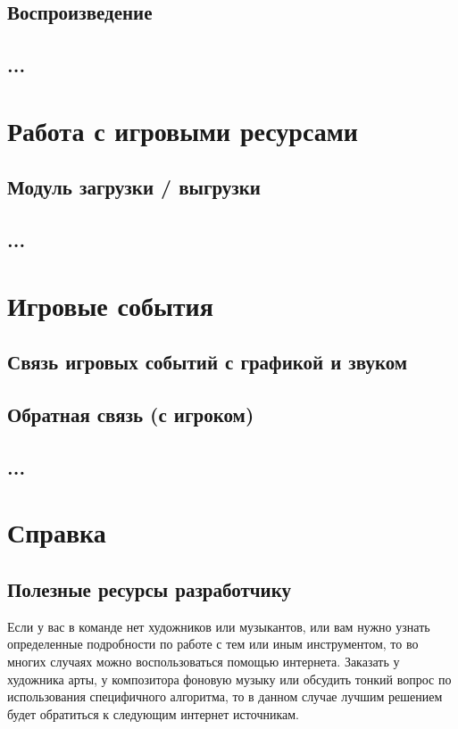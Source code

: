 \section{Воспроизведение}
\section{...}

\chapter{Работа с игровыми ресурсами}
\section{Модуль загрузки / выгрузки}
\section{...}

\chapter{Игровые события}
\section{Связь игровых событий с графикой и звуком}
\section{Обратная связь (с игроком)}
\section{...}

\chapter{Справка}
\section{Полезные ресурсы разработчику}
Если у вас в команде нет художников или музыкантов, или вам нужно узнать определенные подробности по работе с тем или иным инструментом, то во многих случаях 
можно воспользоваться помощью интернета. Заказать у художника арты, у композитора фоновую музыку или обсудить тонкий вопрос по использования специфичного 
алгоритма, то в данном случае лучшим решением будет обратиться к следующим интернет источникам.

